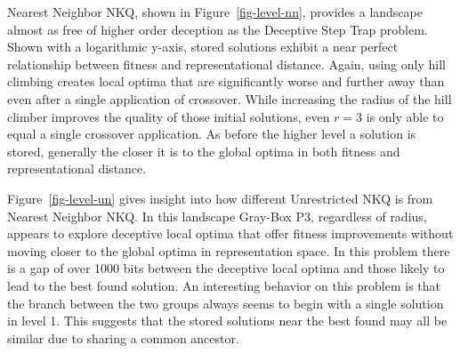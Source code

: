 \begin{figure*}
  \centering
  \caption{Distribution of local optima stored at each level of Gray-Box P3 in relation to the best found by the run on
           a Nearest Neighbor NKQ problem $N=6000$ and $K=4$.}
  \label{fig-level-nn}
\end{figure*}

Nearest Neighbor NKQ, shown in Figure~\ref{fig-level-nn}, provides a landscape almost as free of higher order deception
as the Deceptive Step Trap problem.  Shown with a logarithmic y-axis, stored solutions exhibit a near perfect relationship
between fitness and representational distance. Again, using only hill climbing creates local optima that are significantly
worse and further away than even
after a single application of crossover. While increasing the radius of the hill climber improves the quality of those initial
solutions, even $r=3$ is only able to equal a single crossover application. As before the higher level a solution is stored,
generally the closer it is to the global optima in both fitness and representational distance.

\begin{figure*}
  \centering
  \caption{Distribution of local optima stored at each level of Gray-Box P3 in relation to the best found by the run on
           an Unrestricted NKQ problem $N=6000$ and $K=4$.}
  \label{fig-level-un}
\end{figure*}

Figure~\ref{fig-level-un} gives insight into how different Unrestricted NKQ is from Nearest Neighbor NKQ. In this landscape
Gray-Box P3, regardless of radius, appears to explore deceptive local optima that offer fitness improvements without moving
closer to the global optima in representation space. In this problem there is a gap of over 1000 bits between the deceptive
local optima and those likely to lead to the best found solution. An interesting behavior on this problem is that the branch
between the two groups always seems to begin with a single solution in level 1. This suggests that the stored solutions near
the best found may all be similar due to sharing a common ancestor.

\begin{figure*}
  \centering
  \caption{Distribution of local optima stored at each level of Gray-Box P3 in relation to the best found by the run on an Ising Spin Glass
           $N=6084$.}
  \label{fig-level-is}
\end{figure*}

